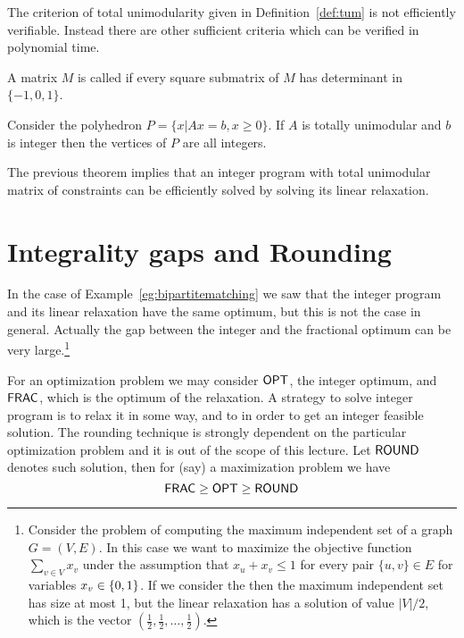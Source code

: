 \documentclass[a4paper,twoside,justified]{tufte-handout}
\begin{document}
\begin{marginfigure}
  The criterion of total unimodularity given in
  Definition~\ref{def:tum} is not efficiently verifiable. Instead
  there are other sufficient criteria which can be verified in
  polynomial time.
\end{marginfigure}

\begin{definition}\label{def:tum}
  A matrix $ M $ is called  if every
  square submatrix of $ M $ has determinant in $\{-1,0,1\}$.
\end{definition}

\begin{theorem}
  Consider the polyhedron $ P=\{x | Ax=b, x\geq 0\}$.  If $ A $ is
  totally unimodular and $ b $ is integer then the vertices of $ P$
  are all integers.
\end{theorem}

The previous theorem implies that an integer program with total
unimodular matrix of constraints can be efficiently solved by solving
its linear relaxation.


\section{Integrality gaps and Rounding}

In the case of Example~\ref{eg:bipartitematching} we saw that the
integer program and its linear relaxation have the same optimum, but
this is not the case in general. Actually the gap between the integer
and the fractional optimum can be very large.\footnote{%
  Consider the problem of computing the maximum independent set of a
  graph $ G=(V,E) $. In this case we want to maximize the objective
  function $ \sum_{v\in V} x_{v} $ under the assumption that $
  x_{u}+x_{v}\leq 1 $ for every pair $ \{u,v\}\in E$ for variables $
  x_{v}\in\{0,1\}$. If we consider the 
  then the maximum independent set has size at most 1, but the linear
  relaxation has a solution of value $ |V|/2 $, which is the vector $
  (\frac{1}{2},\frac{1}{2},\ldots,\frac{1}{2})$.}

For an optimization problem we may consider $\mathsf{OPT}$, the integer
optimum, and $ \mathsf{FRAC}$, which is the optimum of the relaxation. A
strategy to solve integer program is to relax it in some way, and to
 in order to get an
integer feasible solution. The rounding technique is strongly
dependent on the particular optimization problem and it is out of the
scope of this lecture.
%
Let $ \mathsf{ROUND} $ denotes such solution, then for (say) a maximization problem
we have
\begin{equation}
  \label{eq:round_opt_frac}
  \sFRAC \geq \sOPT \geq \sROUND
\end{equation}
\end{document}
